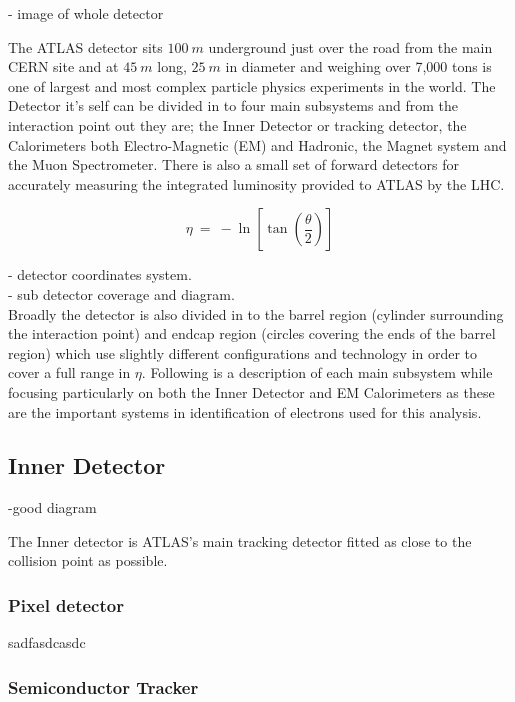 	- image of whole detector

	The ATLAS detector sits $100~m$ underground just over the road from the main CERN site and at $45~m$ long, $25~m$ in diameter and weighing over 7,000 tons is one of largest and most complex particle physics experiments in the world. The Detector it's self can be divided in to four main subsystems and from the interaction point out they are; the Inner Detector or tracking detector, the Calorimeters both Electro-Magnetic (EM) and Hadronic, the Magnet system and the Muon Spectrometer. There is also a small set of forward detectors for accurately measuring the integrated luminosity provided to ATLAS by the LHC. 

	\begin{equation}
		\eta~=~-\ln[\tan(\frac{\theta}{2})]
	\end{equation}

	- detector coordinates system.\\
	- sub detector coverage and diagram.\\

	Broadly the detector is also divided in to the barrel region (cylinder surrounding the interaction point) and endcap region (circles covering the ends of the barrel region) which use slightly different configurations and technology in order to cover a full range in $\eta$.
	Following is a description of each main subsystem while focusing particularly on both the Inner Detector and EM Calorimeters as these are the important systems in identification of electrons used for this analysis.

	\subsection{Inner Detector}

		-good diagram

		The Inner detector is ATLAS's main tracking detector fitted as close to the collision point as possible. 


		\subsubsection*{Pixel detector} 

		sadfasdcasdc



		\subsubsection*{Semiconductor Tracker}

